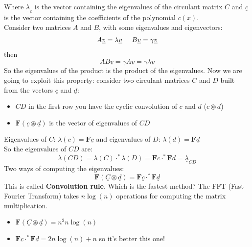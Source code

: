 Where $\underline{\lambda}_c$ is the vector containing the eigenvalues of the circulant matrix $C$ and $\underline{c}$ is the vector containing the coefficients of the polynomial $c(x)$.\\

Consider two matrices $A$ and $B$, with some eigenvalues and eigenvectors:
\[
    A\underline{v} = \lambda \underline{v} \hspace{0.5cm} B\underline{v} = \gamma \underline{v}    
\]
then
\[
    AB\underline{v} = \gamma A\underline{v} = \gamma \lambda \underline{v}     
\]
So the eigenvalues of the product is the product of the eigenvalues. Now we are going to exploit this property: consider two circulant matrices $C$ and $D$ built from the vectors $\underline{c}$ and $\underline{d}$:
\begin{itemize}
    \item $CD$ in the first row you have the cyclic convolution of $\underline{c}$ and $\underline{d}$ ($\underline{c} \circledast \underline{d}$)
    \item $\mathbf{F}(\underline{c} \circledast \underline{d})$ is the vector of eigenvalues of $CD$
\end{itemize}
Eigenvalues of $C$: $\lambda(c) = \mathbf{F}\underline{c}$ and eigenvalues of $D$: $\lambda(d) = \mathbf{F}\underline{d}$\\
So the eigenvalues of $CD$ are:
\[
    \lambda(CD) = \lambda(C) \cdot^* \lambda(D)= \mathbf{F}\underline{c} \cdot^* \mathbf{F}\underline{d} = \underline{\lambda}_{CD}
\]
Two ways of computing the eigenvalues:
\[
    \mathbf{F}(\underline{C} \circledast \underline{d}) = \mathbf{F}\underline{c} \cdot^* \mathbf{F}\underline{d}
\]
This is called \textbf{Convolution rule}. Which is the fastest method?
The FFT (Fast Fourier Transform) takes $n\log(n)$ operations for computing the matrix multiplication.
\begin{itemize}
    \item $\mathbf{F}(\underline{C} \circledast \underline{d}) = n^2 n\log(n)$
    \item $\mathbf{F}\underline{c} \cdot^* \mathbf{F}\underline{d} = 2n\log(n) + n$ \hspace{0.3cm }so it's better this one!
\end{itemize}